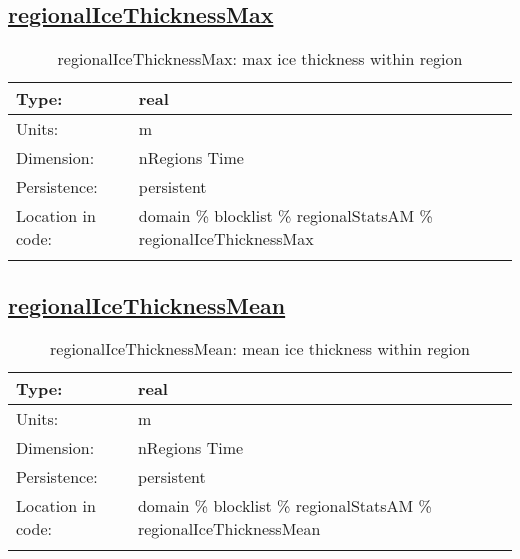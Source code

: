 \subsection[regionalIceThicknessMax]{\hyperref[sec:var_tab_regionalStatsAM]{regionalIceThicknessMax}}
\label{subsec:var_sec_regionalStatsAM_regionalIceThicknessMax}
\begin{center}
\begin{longtable}{| p{2.0in} | p{4.0in} |}
        \hline 
        Type: & real \\
        \hline 
        Units: & \si{m} \\
        \hline 
        Dimension: & nRegions Time \\
        \hline 
        Persistence: & persistent \\
        \hline 
         Location in code: & domain \% blocklist \% regionalStatsAM \% regionalIceThicknessMax \\
         \hline 
    \caption{regionalIceThicknessMax: max ice thickness within region}
\end{longtable}
\end{center}
\subsection[regionalIceThicknessMean]{\hyperref[sec:var_tab_regionalStatsAM]{regionalIceThicknessMean}}
\label{subsec:var_sec_regionalStatsAM_regionalIceThicknessMean}
\begin{center}
\begin{longtable}{| p{2.0in} | p{4.0in} |}
        \hline 
        Type: & real \\
        \hline 
        Units: & \si{m} \\
        \hline 
        Dimension: & nRegions Time \\
        \hline 
        Persistence: & persistent \\
        \hline 
         Location in code: & domain \% blocklist \% regionalStatsAM \% regionalIceThicknessMean \\
         \hline 
    \caption{regionalIceThicknessMean: mean ice thickness within region}
\end{longtable}
\end{center}
